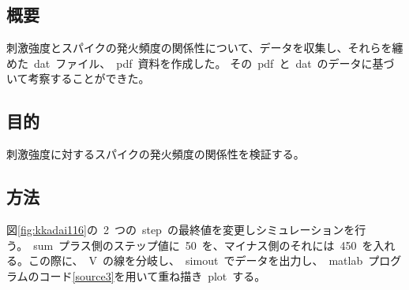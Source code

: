 \documentclass[10pt]{jarticle}
\begin{document}
\subsection{概要}
%
刺激強度とスパイクの発火頻度の関係性について、データを収集し、それらを纏めた\ dat\ ファイル、\ pdf\ 資料を作成した。
その\ pdf\ と\ dat\ のデータに基づいて考察することができた。
%

\subsection{目的}
%
刺激強度に対するスパイクの発火頻度の関係性を検証する。
%

\subsection{方法}
%
図\ref{fig:kkadai116}の\ 2\ つの\ step\ の最終値を変更しシミュレーションを行う。\ sum\ プラス側のステップ値に\ 50\ を、マイナス側のそれには\ 450\ 
を入れる。この際に、\ V\ の線を分岐し、\ simout\ でデータを出力し、\ matlab\ プログラムのコード\ref{source3}を用いて重ね描き\ plot\ する。

%
\end{document}
